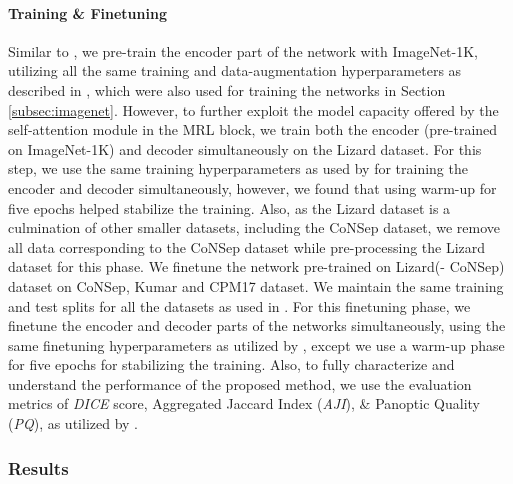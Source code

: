 \documentclass{article}
\begin{document}
\paragraph{Training \& Finetuning} Similar to \cite{DBLP:journals/corr/hovernet}, we pre-train the encoder part of the network with ImageNet-1K, utilizing all the same training and data-augmentation hyperparameters as described in \cite{DBLP:journals/corr/CvT}, which were also used for training the networks in Section \ref{subsec:imagenet}. However, to further exploit the model capacity offered by the self-attention module in the MRL block, we train both the encoder (pre-trained on ImageNet-1K) and decoder simultaneously on the Lizard dataset. For this step, we use the same training hyperparameters as used by \cite{DBLP:journals/corr/hovernet} for training the encoder and decoder simultaneously, however, we found that using warm-up for five epochs helped stabilize the training. Also, as the Lizard dataset is a culmination of other smaller datasets, including the CoNSep dataset, we remove all data corresponding to the CoNSep dataset while pre-processing the Lizard dataset for this phase.
We finetune the network pre-trained on Lizard(- CoNSep) dataset on CoNSep, Kumar and CPM17 dataset. We maintain the same training and test splits for all the datasets as used in \cite{DBLP:journals/corr/hovernet}. For this finetuning phase, we finetune the encoder and decoder parts of the networks simultaneously, using the same finetuning hyperparameters as utilized by \cite{DBLP:journals/corr/hovernet}, except we use a warm-up phase for five epochs for stabilizing the training. Also, to fully characterize and understand the performance of the proposed method, we use the evaluation metrics of \textit{DICE} score, Aggregated Jaccard Index (\textit{AJI}), \& Panoptic Quality (\textit{PQ}), as utilized by \cite{DBLP:journals/corr/hovernet}.


\subsubsection{Results}
\end{document}
